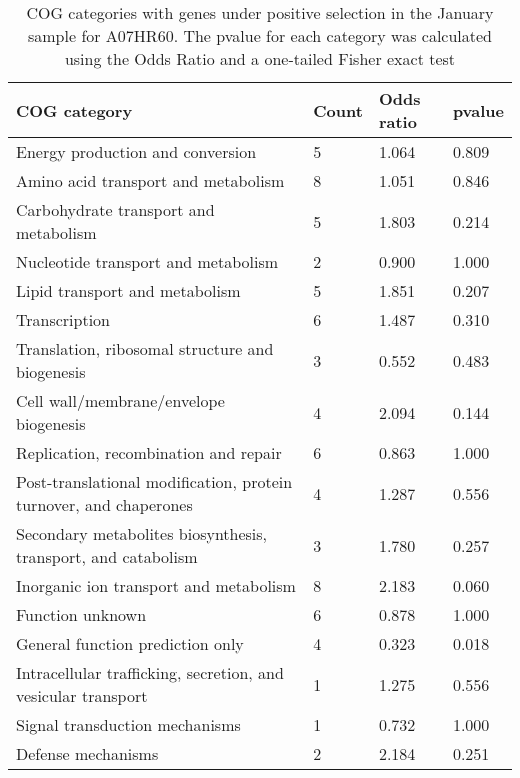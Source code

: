 \begin{table}[]
\footnotesize 
	\tabcolsep=0.11cm 
\caption{COG categories with genes under positive selection in the January sample for A07HR60. The pvalue for each category was calculated using the Odds Ratio and a one-tailed Fisher exact test} 
\begin{tabularx}{\textwidth}{L{6cm}R{2cm}R{2cm}R{2cm}} 
\hline 
\textbf{COG category} & \textbf{Count} & \textbf{Odds ratio} & \textbf{pvalue} \\ 
\hline 
Energy production and conversion & 5 & 1.064 & 0.809 \\ 
Amino acid transport and metabolism & 8 & 1.051 & 0.846 \\ 
Carbohydrate transport and metabolism & 5 & 1.803 & 0.214 \\ 
Nucleotide transport and metabolism & 2 & 0.900 & 1.000 \\ 
Lipid transport and metabolism & 5 & 1.851 & 0.207 \\ 
Transcription & 6 & 1.487 & 0.310 \\ 
Translation, ribosomal structure and biogenesis & 3 & 0.552 & 0.483 \\ 
Cell wall/membrane/envelope biogenesis & 4 & 2.094 & 0.144 \\ 
Replication, recombination and repair & 6 & 0.863 & 1.000 \\ 
Post-translational modification, protein turnover, and chaperones & 4 & 1.287 & 0.556 \\ 
Secondary metabolites biosynthesis, transport, and catabolism & 3 & 1.780 & 0.257 \\ 
Inorganic ion transport and metabolism & 8 & 2.183 & 0.060 \\ 
Function unknown & 6 & 0.878 & 1.000 \\ 
General function prediction only & 4 & 0.323 & 0.018 \\ 
Intracellular trafficking, secretion, and vesicular transport & 1 & 1.275 & 0.556 \\ 
Signal transduction mechanisms & 1 & 0.732 & 1.000 \\ 
Defense mechanisms & 2 & 2.184 & 0.251 \\ 
\end{tabularx} 
\label{January_COG_Selection_A07HR60} 
 \end{table} 

